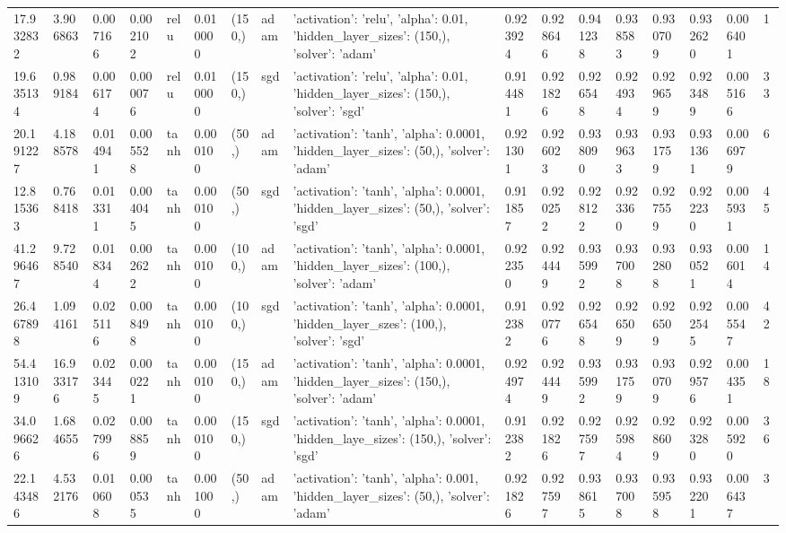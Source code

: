 \documentclass[a1paper]{article}  %
\begin{document}
\begin{landscape}
\begin{tabular}{lllllllllllllllll}
		17.932832 & 3.906863 & 0.007166 & 0.002102 & relu & 0.010000 & (150,) & adam & {'activation': 'relu', 'alpha': 0.01, 'hidden\_layer\_sizes': (150,), 'solver': 'adam'} & 0.923924 & 0.928646 & 0.941238 & 0.938583 & 0.930709 & 0.932620 & 0.006401 & 1 \\
		19.635134 & 0.989184 & 0.006174 & 0.000076 & relu & 0.010000 & (150,) & sgd & {'activation': 'relu', 'alpha': 0.01, 'hidden\_layer\_sizes': (150,), 'solver': 'sgd'} & 0.914481 & 0.921826 & 0.926548 & 0.924934 & 0.929659 & 0.923489 & 0.005166 & 33 \\
		20.191227 & 4.188578 & 0.014941 & 0.005528 & tanh & 0.000100 & (50,) & adam & {'activation': 'tanh', 'alpha': 0.0001, 'hidden\_layer\_sizes': (50,), 'solver': 'adam'} & 0.921301 & 0.926023 & 0.938090 & 0.939633 & 0.931759 & 0.931361 & 0.006979 & 6 \\
		12.815363 & 0.768418 & 0.013311 & 0.004045 & tanh & 0.000100 & (50,) & sgd & {'activation': 'tanh', 'alpha': 0.0001, 'hidden\_layer\_sizes': (50,), 'solver': 'sgd'} & 0.911857 & 0.920252 & 0.928122 & 0.923360 & 0.927559 & 0.922230 & 0.005931 & 45 \\
		41.296467 & 9.728540 & 0.018344 & 0.002622 & tanh & 0.000100 & (100,) & adam & {'activation': 'tanh', 'alpha': 0.0001, 'hidden\_layer\_sizes': (100,), 'solver': 'adam'} & 0.922350 & 0.924449 & 0.935992 & 0.937008 & 0.932808 & 0.930521 & 0.006014 & 14 \\
		26.467898 & 1.094161 & 0.025116 & 0.008498 & tanh & 0.000100 & (100,) & sgd & {'activation': 'tanh', 'alpha': 0.0001, 'hidden\_layer\_szes': (100,), 'solver': 'sgd'} & 0.912382 & 0.920776 & 0.926548 & 0.926509 & 0.926509 & 0.922545 & 0.005547 & 42 \\
		54.413109 & 16.933176 & 0.023445 & 0.000221 & tanh & 0.000100 & (150,) & adam & {'activation': 'tanh', 'alpha': 0.0001, 'hidden\_layer\_sizes': (150,), 'solver': 'adam'} & 0.924974 & 0.924449 & 0.935992 & 0.931759 & 0.930709 & 0.929576 & 0.004351 & 18 \\
		34.096626 & 1.684655 & 0.027996 & 0.008859 & tanh & 0.000100 & (150,) & sgd & {'activation': 'tanh', 'alpha': 0.0001, 'hidden\_laye\_sizes': (150,), 'solver': 'sgd'} & 0.912382 & 0.921826 & 0.927597 & 0.925984 & 0.928609 & 0.923280 & 0.005920 & 36 \\
		22.143486 & 4.532176 & 0.010608 & 0.000535 & tanh & 0.001000 & (50,) & adam & {'activation': 'tanh', 'alpha': 0.001, 'hidden\_layer\_sizes': (50,), 'solver': 'adam'} & 0.921826 & 0.927597 & 0.938615 & 0.937008 & 0.935958 & 0.932201 & 0.006437 & 3 \\

\end{tabular}
\end{landscape}
\end{document}
